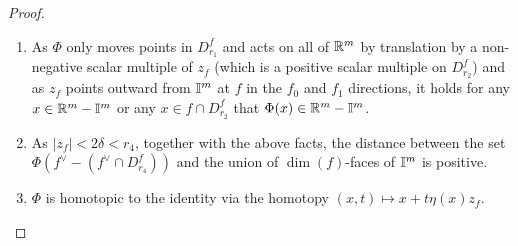 \begin{proof}
\begin{enumerate}
		\item\label{I: pushout} As $\Phi$ only moves points in $D_{r_1}^f$ and acts on all of $\mathbb{R}^m$ by translation by a non-negative scalar multiple of $z_f$ (which is a positive scalar multiple on $D_{r_2}^f$) and as $z_f$ points outward from $\mathbb{I}^m$ at $f$ in the $f_0$ and $f_1$ directions, it holds for any $x \in \mathbb{R}^m - \mathbb{I}^m$ or any $x \in f \cap D_{r_2}^f$ that $\Phi(x) \in \mathbb{R}^m - \mathbb{I}^m$.

		\item As $|z_f| < 2\delta < r_4$, together with the above facts, the distance between the set $\Phi(f^\vee-(f^\vee \cap D_{r_4}^f))$ and the union of $\dim(f)$-faces of $\mathbb{I}^m$ is positive.

		\item\label{I: Phi homotopy} $\Phi$ is homotopic to the identity via the homotopy $(x,t) \mapsto x+ t \eta(x) z_f$.
	\end{enumerate}


\end{proof}
